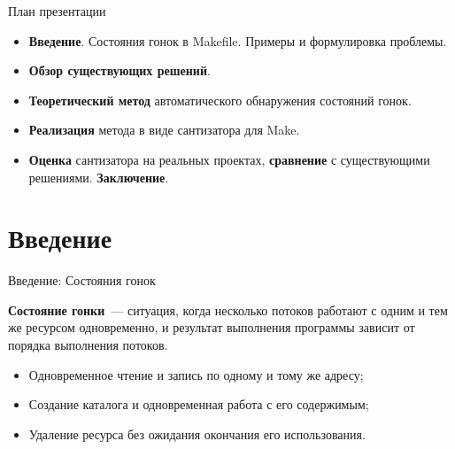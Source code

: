     \begin{frame}{План презентации}
        \begin{itemize}
            \setlength\itemsep{1.1em}
            \item \textbf{Введение}. Состояния гонок в Makefile. Примеры и формулировка проблемы.
            \item \textbf{Обзор существующих решений}.
            \item \textbf{Теоретический метод} автоматического обнаружения состояний гонок.
            \item \textbf{Реализация} метода в виде сантизатора для Make.
            \item \textbf{Оценка} сантизатора на реальных проектах, \textbf{сравнение} с существующими решениями. \textbf{Заключение}.
        \end{itemize}

    \end{frame}


    \section{Введение}

    \begin{frame}{Введение: Состояния гонок}

        \textbf{Состояние гонки}~--- ситуация, когда несколько потоков работают с одним и тем же ресурсом одновременно,
        и результат выполнения программы зависит от порядка выполнения потоков.

        \begin{itemize}
            \item Одновременное чтение и запись по одному и тому же адресу;
            \item Создание каталога и одновременная работа с его содержимым;
            \item Удаление ресурса без ожидания окончания его использования.
        \end{itemize}


    \end{frame}

